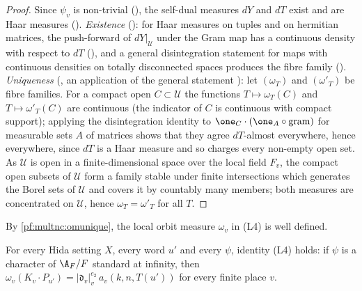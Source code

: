 \begin{proof}
Since $\psi_v$ is non-trivial (), the self-dual measures $dY$
and $dT$ exist and are Haar measures (). \emph{Existence}
(): for Haar measures on tuples and on hermitian matrices, the
push-forward of $dY|_{\mathcal U}$ under the Gram map has a continuous density with respect to $dT$
(), and a general disintegration statement for maps with continuous densities on
totally disconnected spaces produces the fibre family ().
\emph{Uniqueness} (, an application of the general statement
): let $(\omega_T)$ and $(\omega'_T)$ be fibre families. For a compact open
$C\subset\mathcal U$ the functions $T\mapsto\omega_T(C)$ and $T\mapsto\omega'_T(C)$ are continuous (the indicator of $C$ is
continuous with compact support); applying the disintegration identity to $\one_C\cdot(\one_A\circ\mathrm{gram})$ for
measurable sets $A$ of matrices shows that they agree $dT$-almost everywhere, hence everywhere, since $dT$ is a Haar measure
and so charges every non-empty open set. As $\mathcal U$ is open in a finite-dimensional space over the local field $F_v$,
the compact open subsets of $\mathcal U$ form a family stable under finite intersections which generates the Borel sets of
$\mathcal U$ and covers it by countably many members; both measures are concentrated on $\mathcal U$, hence
$\omega_T=\omega'_T$ for all $T$.
\end{proof}

By \cref{pf:multnc:omunique}, the local orbit measure $\omega_v$ in (L4) is well defined.

\begin{proposition}\label{pf:multnc:omv}
For every Hida setting $X$, every word $u'$ and every $\psi$, identity (L4) holds: if $\psi$ is a character of $\A_F/F$
standard at infinity, then $\omega_v(K_v\cdot P_{u'})=|\mathfrak d_v|_v^{e_2}\,a_v(k,n,T(u'))$ for every finite place $v$.
\end{proposition}


